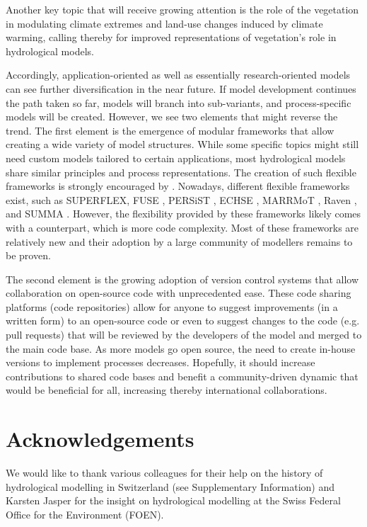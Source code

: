 \documentclass[10pt,a4paper]{article}
\begin{document}
Another key topic that will receive growing attention is the role of the
vegetation in modulating climate extremes \citep{Mastrotheodoros_2020} and
land-use changes induced by climate warming, calling thereby for
improved representations of vegetation's role in hydrological models.

Accordingly, application-oriented as well as essentially
research-oriented models can see further diversification in the near
future. If model development continues the path taken so far, models
will branch into sub-variants, and process-specific models will be
created. However, we see two elements that might reverse the trend. The
first element is the emergence of modular frameworks that allow creating
a wide variety of model structures. While some specific topics might
still need custom models tailored to certain applications, most
hydrological models share similar principles and process
representations. The creation of such flexible frameworks is strongly
encouraged by \citet{Clark2011a}. Nowadays, different flexible
frameworks exist, such as SUPERFLEX, FUSE \citep{Clark2008},
PERSiST \citep{Futter2014}, ECHSE \citep{Kneis2015},
MARRMoT \citep{Knoben2019}, Raven \citep{Craig2020}, and
SUMMA \citep{Clark2015}. {However, the flexibility provided by these
frameworks likely comes with a counterpart, which is more code
complexity. Most of these frameworks are relatively new and their
adoption by a large community of modellers remains to be proven}. 

The second element is the growing adoption of version control systems
that allow collaboration on open-source code with unprecedented ease.
These code sharing platforms (code repositories) allow for anyone to
suggest improvements (in a written form) to an open-source code or even
to suggest changes to the code (e.g. pull requests) that will be
reviewed by the developers of the model and merged to the main code
base. As more models go open source, the need to create in-house
versions to implement processes decreases. Hopefully, it should increase
contributions to shared code bases and benefit a community-driven
dynamic that would be beneficial for all, increasing thereby
international collaborations.


\section*{Acknowledgements}

We would like to thank various colleagues for their help on the history
of hydrological modelling in Switzerland (see Supplementary Information)
and Karsten Jasper for the insight on hydrological modelling at the
Swiss Federal Office for the Environment (FOEN).
\end{document}
